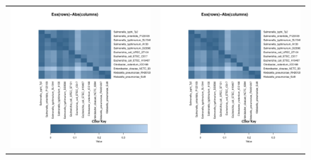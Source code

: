 \documentclass[a4paper,10pt, twocolumn]{article}
\begin{document}
\begin{figure}
\begin{tabular}{c c}
\includegraphics[page=2, scale=0.34]{essentiality-heatmap.pdf} &
\includegraphics[page=3, scale=0.34]{essentiality-heatmap.pdf} \\ 

\end{tabular}
\end{figure}
\end{document}
